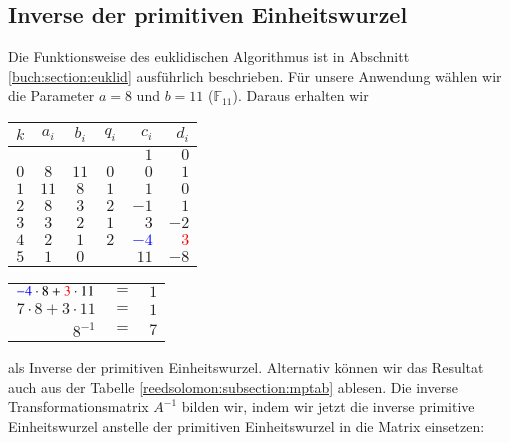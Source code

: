 
\subsection{Inverse der primitiven Einheitswurzel
\label{reedsolomon:subsection:invEinh}}
%
Die Funktionsweise des euklidischen Algorithmus ist in Abschnitt \ref{buch:section:euklid} ausführlich beschrieben.
Für unsere Anwendung wählen wir die Parameter $a = 8$ und $b = 11$ ($\mathbb{F}_{11}$).
Daraus erhalten wir 

\begin{center}

\begin{tabular}{| c | c c | c | r r |}
	\hline
	$k$ & $a_i$ & $b_i$ & $q_i$ & $c_i$ & $d_i$\\
	\hline 
	& & & & $1$& $0$\\
	$0$& $8$& $11$& $0$& $0$& $1$\\
	$1$& $11$& $8$& $1$& $1$& $0$\\
	$2$& $8$& $3$& $2$& $-1$& $1$\\
	$3$& $3$& $2$& $1$& $3$& $-2$\\
	$4$& $2$& $1$& $2$& \textcolor{blue}{$-4$}& \textcolor{red}{$3$}\\
	$5$& $1$& $0$& & $11$& $-8$\\
	\hline
\end{tabular}

\end{center}
\begin{center}

\begin{tabular}{rcl}
	$\textcolor{blue}{-4} \cdot 8 + \textcolor{red}{3} \cdot 11$ &$=$& $1$\\
	$7 \cdot 8 + 3 \cdot 11$ &$=$& $1$\\
	$8^{-1}$ &$=$& $7$
	
\end{tabular}

\end{center}
als Inverse der primitiven Einheitswurzel.
Alternativ können wir das Resultat auch aus der Tabelle \ref{reedsolomon:subsection:mptab} ablesen.
Die inverse Transformationsmatrix $A^{-1}$ bilden wir, indem wir jetzt die inverse primitive Einheitswurzel anstelle der primitiven Einheitswurzel in die Matrix einsetzen:

